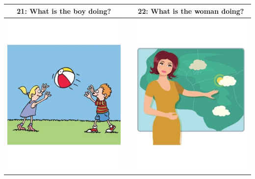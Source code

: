 \documentclass[12pt,notitlepage]{article}
\begin{document}
\begin{center}
\begin{tabular}{|c|c|c|}
\hline
21: What is the boy doing? && 22: What is the woman doing? \\
\hline
\includegraphics[width=20em,trim=0 0 0 -3]{figures/I21.jpg} & & \includegraphics[width=20em,trim=0 0 0 -3]{figures/I22.jpg} \\
\hline
\end{tabular}
\vspace{1em} \\



\end{center}
\end{document}

